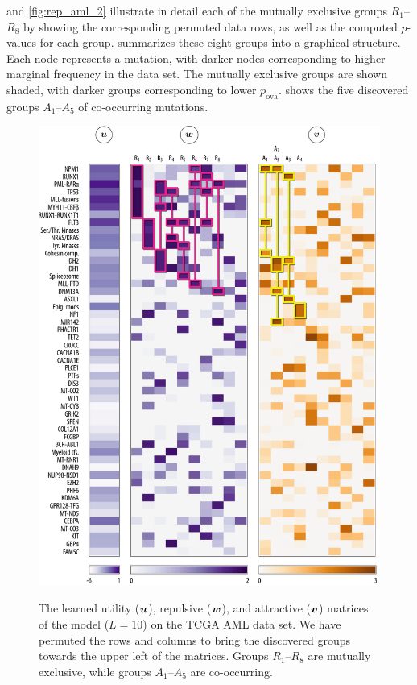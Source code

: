  and \ref{fig:rep_aml_2} illustrate in detail each of the mutually exclusive groups $R_1$--$R_8$ by showing the corresponding permuted data rows, as well as the computed $p$-values for each group.
 summarizes these eight groups into a graphical structure.
Each node represents a mutation, with darker nodes corresponding to higher marginal frequency in the data set.
The mutually exclusive groups are shown shaded, with darker groups corresponding to lower $p_{\mathrm{ova}}$.
 shows the five discovered groups $A_1$--$A_5$ of co-occurring mutations.

\begin{figure}[htbp]
\centering
\includegraphics[width=\textwidth]{figures/genes/mat_aml.pdf}\\[1em]
\caption{The learned utility ($\bm{u}$), repulsive ($\bm{w}$), and attractive ($\bm{v}$) matrices of the \fldc{} model ($L = 10$) on the TCGA AML data set.
We have permuted the rows and columns to bring the discovered groups towards the upper left of the matrices.
Groups $R_1$--$R_8$ are mutually exclusive, while groups $A_1$--$A_5$ are co-occurring.
}
\label{fig:mat_aml}
\end{figure}


